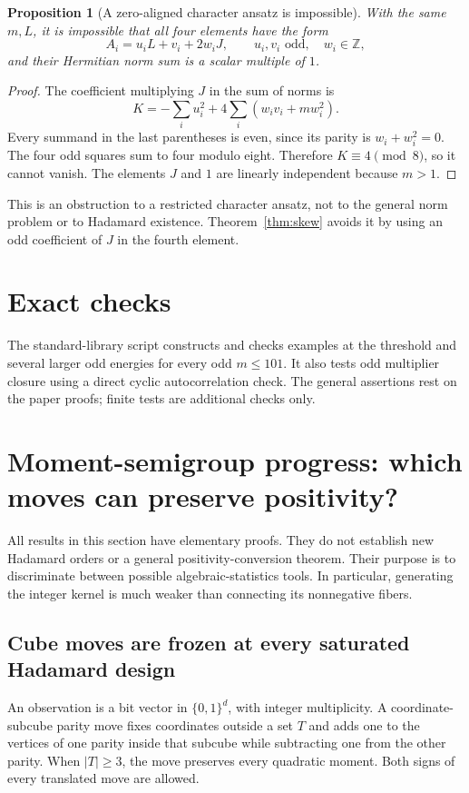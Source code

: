 \documentclass[11pt]{article}
\newtheorem{proposition}{Proposition}[section]
\newcommand{\Z}{\mathbb Z}
\newcommand{\R}{\mathbb R}
\begin{document}
\begin{proposition}[A zero-aligned character ansatz is impossible]
With the same $m,L$, it is impossible that all four elements have the
form
\[
 A_i=u_iL+v_i+2w_iJ,\qquad u_i,v_i\text{ odd},\quad w_i\in\Z,
\]
and their Hermitian norm sum is a scalar multiple of $1$.
\end{proposition}
\begin{proof}
The coefficient multiplying $J$ in the sum of norms is
\[
 K=-\sum_i u_i^2+4\sum_i(w_iv_i+mw_i^2).
\]
Every summand in the last parentheses is even, since its parity is
$w_i+w_i^2=0$. The four odd squares sum to four modulo eight.
Therefore $K\equiv4\pmod8$, so it cannot vanish. The elements $J$ and
$1$ are linearly independent because $m>1$.
\end{proof}
This is an obstruction to a restricted character ansatz, not to the
general norm problem or to Hadamard existence. Theorem~\ref{thm:skew}
avoids it by using an odd coefficient of $J$ in the fourth element.

\section*{Exact checks}
The standard-library script  constructs and
checks examples at the threshold and several larger odd energies for
every odd $m\le101$. It also tests odd multiplier closure using a direct
cyclic autocorrelation check. The general assertions rest on the paper
proofs; finite tests are additional checks only.

\section{Moment-semigroup progress: which moves can preserve positivity?}
All results in this section have elementary proofs. They do not establish
new Hadamard orders or a general positivity-conversion theorem. Their
purpose is to discriminate between possible algebraic-statistics tools.
In particular, generating the integer kernel is much weaker than connecting
its nonnegative fibers.

\subsection{Cube moves are frozen at every saturated Hadamard design}
An observation is a bit vector in $\{0,1\}^d$, with integer multiplicity.
A coordinate-subcube parity move fixes coordinates outside a set $T$ and
adds one to the vertices of one parity inside that subcube while subtracting
one from the other parity. When $|T|\ge3$, the move preserves every
quadratic moment. Both signs of every translated move are allowed.
\end{document}
